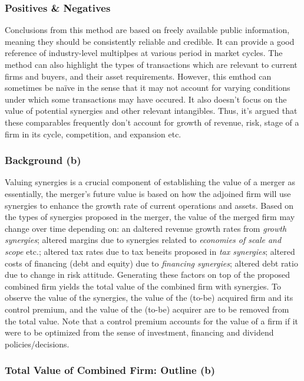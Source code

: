 \documentclass[11pt, english]{article}
\begin{document}
		\subsubsection*{Positives \& Negatives}

	Conclusions from this method are based on freely available public information, meaning they should be consistently reliable and credible. It can provide a good reference of industry-level multiplpes at various period in market cycles. The method can also highlight the types of transactions which are relevant to current firms and buyers, and their asset requirements. However, this emthod can sometimes be na\"{i}ve in the sense that it may not account for varying conditions under which some transactions may have occured. It also doesn't focus on the value of potential synergies and other relevant intangibles. Thus, it's argued that these comparables frequently don't account for growth of revenue, risk, stage of a firm in its cycle, competition, and expansion etc.

		\subsubsection*{Background (b)}

	Valuing synergies is a crucial component of establishing the value of a merger as essentially, the merger's future value is based on how the adjoined firm will use synergies to enhance the growth rate of current operations and assets. Based on the types of synergies proposed in the merger, the value of the merged firm may change over time depending on: an daltered revenue growth rates from \textit{growth synergies}; altered margins due to synergies related to \textit{economies of scale and scope} etc.; altered tax rates due to tax beneits proposed in \textit{tax synergies}; altered costs of financing (debt and equity) due to \textit{financing synergies}; altered debt ratio due to change in risk attitude. Generating these factors on top of the proposed combined firm yields the total value of the combined firm with synergies. To observe the value of the synergies, the value of the (to-be) acquired firm and its control premium, and the value of the (to-be) acquirer are to be removed from the total value. Note that a control premium accounts for the value of a firm if it were to be optimized from the sense of investment, financing and dividend policies/decisions.

		\subsubsection*{Total Value of Combined Firm: Outline (b)}
\end{document}
